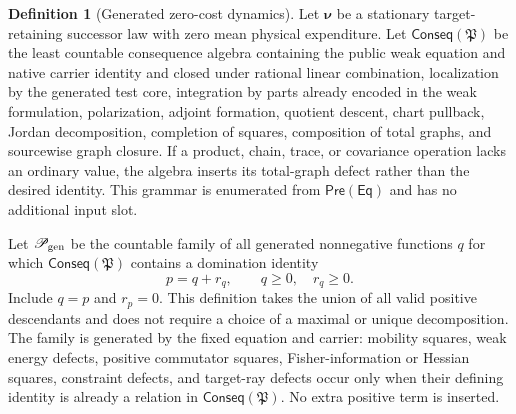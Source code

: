 \documentclass[11pt]{article}
\numberwithin{section}{part}
\theoremstyle{plain}
\theoremstyle{definition}
\newtheorem{definition}[definition]{Definition}
\theoremstyle{remark}
\begin{document}
\begin{definition}[Generated zero-cost dynamics]
\label{def:generated-saturation-equations}
Let \(\boldsymbol\nu\) be a stationary target-retaining successor law with
zero mean physical expenditure.  Let
\(\mathsf{Conseq}(\mathfrak P)\) be the least countable consequence algebra
containing the public weak equation and native carrier identity and closed
under rational linear combination, localization by the generated test core,
integration by parts already encoded in the weak formulation, polarization,
adjoint formation, quotient descent, chart pullback, Jordan decomposition,
completion of squares, composition of total graphs, and sourcewise graph
closure.  If a product, chain, trace, or covariance operation lacks an
ordinary value, the algebra inserts its total-graph defect rather than the
desired identity.  This grammar is enumerated from
\(\mathsf{Pre}(\mathsf{Eq})\) and has no additional input slot.

Let \(\mathscr P_{\rm gen}\) be the countable family of all generated
nonnegative functions \(q\) for which
\(\mathsf{Conseq}(\mathfrak P)\) contains a domination identity
\begin{equation}
 \label{eq:generated-nonnegative-completion}
 p=q+r_q,
 \qquad q\ge0,\quad r_q\ge0.
\end{equation}
Include \(q=p\) and \(r_p=0\).  This definition takes the union of all valid
positive descendants and does not require a choice of a maximal or unique
decomposition.  The family is generated by the fixed equation and carrier:
mobility squares, weak energy defects, positive commutator squares,
Fisher-information or Hessian squares, constraint defects, and target-ray
defects occur only when their defining identity is already a relation in
\(\mathsf{Conseq}(\mathfrak P)\).  No extra positive term is inserted.


\end{definition}
\end{document}
